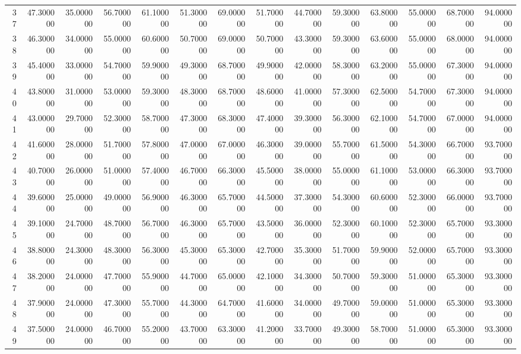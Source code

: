\begin{tabular}{rrrrrrrrrrrrrr}
37 & 47.300000 & 35.000000 & 56.700000 & 61.100000 & 51.300000 & 69.000000 & 51.700000 & 44.700000 & 59.300000 & 63.800000 & 55.000000 & 68.700000 & 94.000000 \\
38 & 46.300000 & 34.000000 & 55.000000 & 60.600000 & 50.700000 & 69.000000 & 50.700000 & 43.300000 & 59.300000 & 63.600000 & 55.000000 & 68.000000 & 94.000000 \\
39 & 45.400000 & 33.000000 & 54.700000 & 59.900000 & 49.300000 & 68.700000 & 49.900000 & 42.000000 & 58.300000 & 63.200000 & 55.000000 & 67.300000 & 94.000000 \\
40 & 43.800000 & 31.000000 & 53.000000 & 59.300000 & 48.300000 & 68.700000 & 48.600000 & 41.000000 & 57.300000 & 62.500000 & 54.700000 & 67.300000 & 94.000000 \\
41 & 43.000000 & 29.700000 & 52.300000 & 58.700000 & 47.300000 & 68.300000 & 47.400000 & 39.300000 & 56.300000 & 62.100000 & 54.700000 & 67.000000 & 94.000000 \\
42 & 41.600000 & 28.000000 & 51.700000 & 57.800000 & 47.000000 & 67.000000 & 46.300000 & 39.000000 & 55.700000 & 61.500000 & 54.300000 & 66.700000 & 93.700000 \\
43 & 40.700000 & 26.000000 & 51.000000 & 57.400000 & 46.700000 & 66.300000 & 45.500000 & 38.000000 & 55.000000 & 61.100000 & 53.000000 & 66.300000 & 93.700000 \\
44 & 39.600000 & 25.000000 & 49.000000 & 56.900000 & 46.300000 & 65.700000 & 44.500000 & 37.300000 & 54.300000 & 60.600000 & 52.300000 & 66.000000 & 93.700000 \\
45 & 39.100000 & 24.700000 & 48.700000 & 56.700000 & 46.300000 & 65.700000 & 43.500000 & 36.000000 & 52.300000 & 60.100000 & 52.300000 & 65.700000 & 93.300000 \\
46 & 38.800000 & 24.300000 & 48.300000 & 56.300000 & 45.300000 & 65.300000 & 42.700000 & 35.300000 & 51.700000 & 59.900000 & 52.000000 & 65.700000 & 93.300000 \\
47 & 38.200000 & 24.000000 & 47.700000 & 55.900000 & 44.700000 & 65.000000 & 42.100000 & 34.300000 & 50.700000 & 59.300000 & 51.000000 & 65.300000 & 93.300000 \\
48 & 37.900000 & 24.000000 & 47.300000 & 55.700000 & 44.300000 & 64.700000 & 41.600000 & 34.000000 & 49.700000 & 59.000000 & 51.000000 & 65.300000 & 93.300000 \\
49 & 37.500000 & 24.000000 & 46.700000 & 55.200000 & 43.700000 & 63.300000 & 41.200000 & 33.700000 & 49.300000 & 58.700000 & 51.000000 & 65.300000 & 93.300000 \\

\end{tabular}
